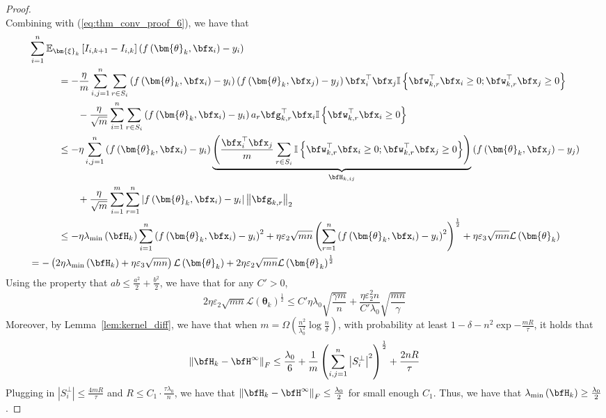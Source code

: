 \documentclass[10pt]{article} %
\theoremstyle{definition}
\theoremstyle{plain}
\newcommand{\paren}[1]{\left(#1\right)}
\newcommand{\norm}[1]{\left\|#1\right\|}
\newcommand{\indy}[1]{\mathbb{I}\left\{#1\right\}}
\providecommand{\E}{\mathbb{E}}
\def\calL{{\mathcal{L}}}
\begin{document}
\begin{proof}
\[    \]
    Combining with (\ref{eq:thm_conv_proof_6}), we have that
    \begin{align*}
        & \sum_{i=1}^n\E_{\bm{\xi}_k}\left[I_{i,k+1} - I_{i,k}\right]\paren{f\paren{\bm{\theta}_k,\bfx_i}-y_i}\\
        &\quad\quad\quad  = -\frac{\eta}{m}\sum_{i,j=1}^n\sum_{r\in S_i}\paren{f\paren{\bm{\theta}_k,\bfx_i}-y_i}\paren{f\paren{\bm{\theta}_k,\bfx_j}-y_j}\bfx_i^\top\bfx_j\indy{\bfw_{k,r}^\top\bfx_i\geq 0;\bfw_{k,r}^\top\bfx_j\geq 0}\\
        &\quad\quad\quad\quad\quad - \frac{\eta}{\sqrt{m}}\sum_{i=1}^n\sum_{r\in S_i}\paren{f\paren{\bm{\theta}_k,\bfx_i}-y_i}a_r\bfg_{k,r}^\top\bfx_i\indy{\bfw_{k,r}^\top\bfx_i\geq0}\\
        &\quad\quad\quad  \leq -\eta\sum_{i,j=1}^n\paren{f\paren{\bm{\theta}_k,\bfx_i}-y_i}\underbrace{\paren{\frac{\bfx_i^\top\bfx_j}{m}\sum_{r\in S_i}\indy{\bfw_{k,r}^\top\bfx_i\geq 0;\bfw_{k,r}^\top\bfx_j\geq 0}}}_{\bfH_{k,ij}}\paren{f\paren{\bm{\theta}_k,\bfx_j}-y_j}\\
        &\quad\quad\quad\quad\quad + \frac{\eta}{\sqrt{m}}\sum_{i=1}^m\sum_{r=1}^n\left|f\paren{\bm{\theta}_k,\bfx_i}-y_i\right|\norm{\bfg_{k,r}}_2\\
        & \quad\quad\quad  \leq-\eta\lambda_{\min}\paren{\bfH_k}\sum_{i=1}^n\paren{f\paren{\bm{\theta}_k,\bfx_i}-y_i}^2 + \eta\varepsilon_2\sqrt{mn}\paren{\sum_{r=1}^n\paren{f\paren{\bm{\theta}_k,\bfx_i}-y_i}^2}^{\frac{1}{2}} + \eta\varepsilon_3\sqrt{mn}\calL\paren{\bm{\theta}_k}\\
        & = -\paren{2\eta\lambda_{\min}\paren{\bfH_k} + \eta\varepsilon_3\sqrt{mn}}\calL\paren{\bm{\theta}_k} + 2\eta\varepsilon_2\sqrt{mn}\calL\paren{\bm{\theta}_k}^{\frac{1}{2}}
    \end{align*}
    Using the property that $ab \leq \frac{a^2}{2} + \frac{b^2}{2}$, we have that for any $C' > 0$,
    \[
        2\eta\varepsilon_2\sqrt{mn}\calL\paren{\bm{\theta}_k}^{\frac{1}{2}} \leq C'\eta\lambda_0\sqrt{\frac{\gamma m}{n}} + \frac{\eta\varepsilon_2^2 n}{C'\lambda_0}\sqrt{\frac{mn}{\gamma}}
    \]
    Moreover, by Lemma~\ref{lem:kernel_diff}, we have that when $m = \Omega\paren{\frac{n^2}{\lambda_0^2}\log\frac{n}{\delta}}$, with probability at least $1 - \delta - n^2\exp{-\frac{mR}{\tau}}$, it holds that 
    \[
        \norm{\bfH_k - \bfH^\infty}_F \leq \frac{\lambda_0}{6} + \frac{1}{m}\paren{\sum_{i,j=1}^n\left|S_i^\perp\right|^2}^{\frac{1}{2}} + \frac{2nR}{\tau}
    \]
    Plugging in $\left|S_i^\perp\right|\leq \frac{4mR}{\tau}$ and $R\leq C_1\cdot\frac{\tau\lambda_0}{n}$, we have that $\norm{\bfH_k - \bfH^\infty}_F \leq \frac{\lambda_0}{2}$ for small enough $C_1$. Thus, we have that $\lambda_{\min}\paren{\bfH_k}\geq \frac{\lambda_0}{2}$. 

\end{proof}
\end{document}
